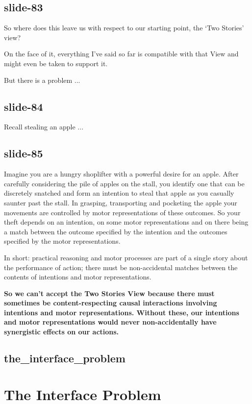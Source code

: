 \documentclass[12pt,\papersize]{extarticle}
\begin{document}
\subsection{slide-83}
So where does this leave us with respect to our starting point,
the ‘Two Stories’ view?

On the face of it, everything I’ve said so far is compatible with that View
and might even be taken to support it.

But there is a problem ...

\subsection{slide-84}
Recall stealing an apple ...

\subsection{slide-85}
Imagine you are a hungry shoplifter with a powerful desire for an apple.  After carefully
considering the pile of apples on the stall, you identify one that can be discretely
snatched and form an intention to steal that apple as you casually saunter past the stall.
In grasping, transporting and pocketing the apple your movements are controlled by motor
representations of these outcomes.  So your theft depends on an intention, on some motor
representations and on there being a match between the outcome specified by the intention
and the outcomes specified by the motor representations.

In short: practical reasoning and motor processes are part of a single story about the
performance of action; there must be non-accidental matches between the contents of
intentions and motor representations.

\textbf{So we can’t accept the Two Stories View because there must sometimes be content-respecting
causal interactions involving intentions and motor representations.
Without these, our intentions and motor representations would never non-accidentally
have synergistic effects on our actions.}

\subsection{the\_interface\_problem}


\section{The Interface Problem}
\end{document}
